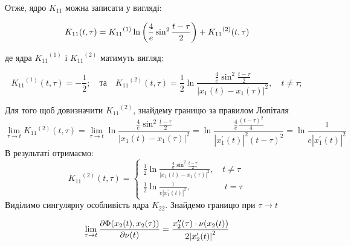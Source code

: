\documentclass[14pt,a4paper]{extarticle}
\newcounter{e}
\numberwithin{equation}{section}
\begin{document}
Отже, ядро $K_{11}$ можна записати у вигляді:


$$
	\displaystyle
	K_{11}(t, \tau) = {K_{11}}^{(1)} \ln \left(\frac{4}{e} \sin ^{2}  \frac{t-\tau}{2}\right)+{K_{11}}^{(2)}(t, \tau) \\
$$

де ядра ${K_{11}}^{(1)}$ і ${K_{11}}^{(2)}$ матимуть вигляд:

$$
	\displaystyle
	{K_{11}}^{(1)}(t, \tau) =-\frac{1}{2};
	\displaystyle
	\quad \text{та} \quad
	\displaystyle
	{K_{11}}^{(2)}(t, \tau) =\frac{1}{2} \ln{\frac{\frac{4}{e} \sin ^{2} \frac{t-\tau}{2}}{\left|x_{1}(t)-x_{1}(\tau)\right|^{2}}}, \quad t \neq \tau;
$$

Для того щоб довизначити ${K_{11}}^{(2)}$, знайдему границю за правилом Лопіталя
$$
\lim _{\tau \rightarrow t} K_{11}{ }^{(2)}(t, \tau) = \lim _{\tau \rightarrow t} \ln \frac{\frac{4}{e} \sin ^{2} \frac{t-\tau}{2}}{\left|x_{1}(t)-x_{1}(\tau)\right|^{2}}=\ln \frac{\frac{4}{e} \frac{(t-\tau)^{2}}{4}}{\left|x_{1}^{\prime}(t)\right|^{2}(t-\tau)^{2}}=\ln \frac{1}{e\left|x_{1}^{\prime}(t)\right|^{2}}
$$
В результаті отримаємо:
$$
{K_{11}}^{(2)}(t, \tau) =
\left\{
\begin{array}{l}
	\displaystyle
	\frac{1}{2} \ln{\frac{\frac{4}{e} \sin ^{2} \frac{t-\tau}{2}}{\left|x_{1}(t)-x_{1}(\tau)\right|^{2}}}
	,\quad t \neq \tau
	\\ [1cm]
	
	\displaystyle
	\frac{1}{2} \ln \frac{1}{e\left|x_{1}^{\prime}(t)\right|^{2}}
	,\quad  \quad  \quad  \quad   t = \tau
\end{array}
\right.
$$
Виділимо сингулярну особливість ядра $K_{22}$. Знайдемо границю при $\tau \rightarrow t$

$$
\lim_{\tau \rightarrow t } \pdv{\Phi(x_{2}(t), x_{2}(\tau))}{\nu(t)} =
\frac{  x''_{2}(\tau) \cdot \nu (x_2(t)) }{ 2\abs{ x'_{2}(t)}^2 } 
$$
\end{document}
